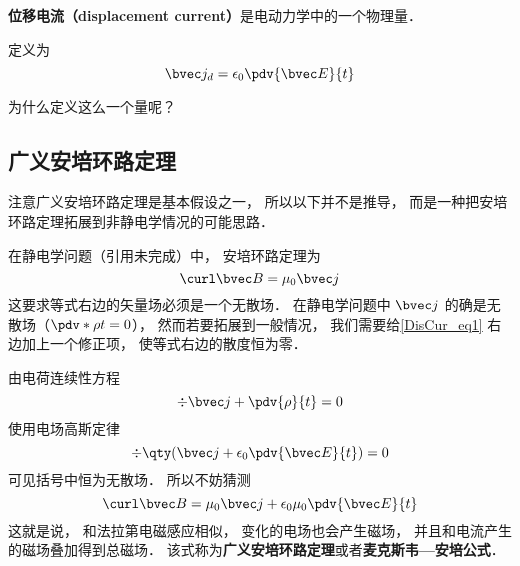 
\begin{issues}
\issueDraft
\end{issues}


\textbf{位移电流（displacement current）}是电动力学中的一个物理量．

定义为
\begin{equation}
\bvec j_d = \epsilon_0 \pdv{\bvec E}{t}
\end{equation}

为什么定义这么一个量呢？

\subsection{广义安培环路定理}

注意广义安培环路定理是基本假设之一， 所以以下并不是推导， 而是一种把安培环路定理拓展到非静电学情况的可能思路．

在静电学问题（引用未完成）中， 安培环路定理为
\begin{equation}\label{DisCur_eq1}
\curl\bvec B = \mu_0\bvec j
\end{equation}
这要求等式右边的矢量场必须是一个无散场． 在静电学问题中 $\bvec j$ 的确是无散场（$\pdv*{\rho}{t} = 0$）， 然而若要拓展到一般情况， 我们需要给\autoref{DisCur_eq1} 右边加上一个修正项， 使等式右边的散度恒为零．

由电荷连续性方程
\begin{equation}
\div \bvec j + \pdv{\rho}{t} = 0
\end{equation}
使用电场高斯定律
\begin{equation}
\div \qty(\bvec j + \epsilon_0\pdv{\bvec E}{t}) = 0
\end{equation}
可见括号中恒为无散场． 所以不妨猜测
\begin{equation}
\curl\bvec B = \mu_0\bvec j + \epsilon_0\mu_0\pdv{\bvec E}{t}
\end{equation}
这就是说， 和法拉第电磁感应相似， 变化的电场也会产生磁场， 并且和电流产生的磁场叠加得到总磁场． 该式称为\textbf{广义安培环路定理}或者\textbf{麦克斯韦—安培公式}．
